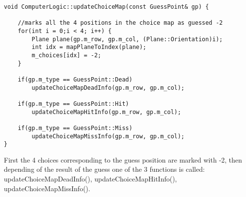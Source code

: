 \begin{lstlisting}
void ComputerLogic::updateChoiceMap(const GuessPoint& gp) {

	//marks all the 4 positions in the choice map as guessed -2
	for(int i = 0;i < 4; i++) {
		Plane plane(gp.m_row, gp.m_col, (Plane::Orientation)i);
		int idx = mapPlaneToIndex(plane);
		m_choices[idx] = -2;
	}
	
	if(gp.m_type == GuessPoint::Dead)
		updateChoiceMapDeadInfo(gp.m_row, gp.m_col);
	
	if(gp.m_type == GuessPoint::Hit)
		updateChoiceMapHitInfo(gp.m_row, gp.m_col);
	
	if(gp.m_type == GuessPoint::Miss)
		updateChoiceMapMissInfo(gp.m_row, gp.m_col);
}
\end{lstlisting}

First the 4 choices corresponding to the guess position are marked with -2, then depending of the result of the guess one of the 3 functions is called: updateChoiceMapDeadInfo(), updateChoiceMapHitInfo(), updateChoiceMapMissInfo(). 

